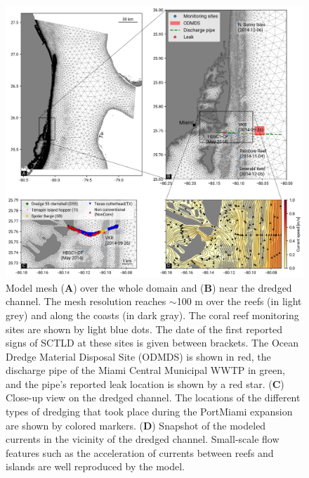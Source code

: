 \documentclass[preprint,12pt,authoryear]{elsarticle}
\begin{document}
\begin{figure}
	\centering
	\includegraphics[width=\textwidth]{figures/fig_mesh_new.png}
    \caption{Model mesh (\textbf{A}) over the whole domain and (\textbf{B}) near the dredged channel. The mesh resolution reaches $\sim$100 m over the reefs (in light grey) and along the coasts (in dark gray). The coral reef monitoring sites are shown by light blue dots. The date of the first reported signs of SCTLD at these sites is given between brackets. The Ocean Dredge Material Disposal Site (ODMDS) is shown in red, the discharge pipe of the Miami Central Municipal WWTP in green, and the pipe's reported leak location is shown by a red star. (\textbf{C}) Close-up view on the dredged channel. The locations of the different types of dredging that took place during the PortMiami expansion are shown by colored markers. (\textbf{D}) Snapshot of the modeled currents in the vicinity of the dredged channel. Small-scale flow features such as the acceleration of currents between reefs and islands are well reproduced by the model.}
	\label{fig:onset_mesh}
\end{figure}
\end{document}
